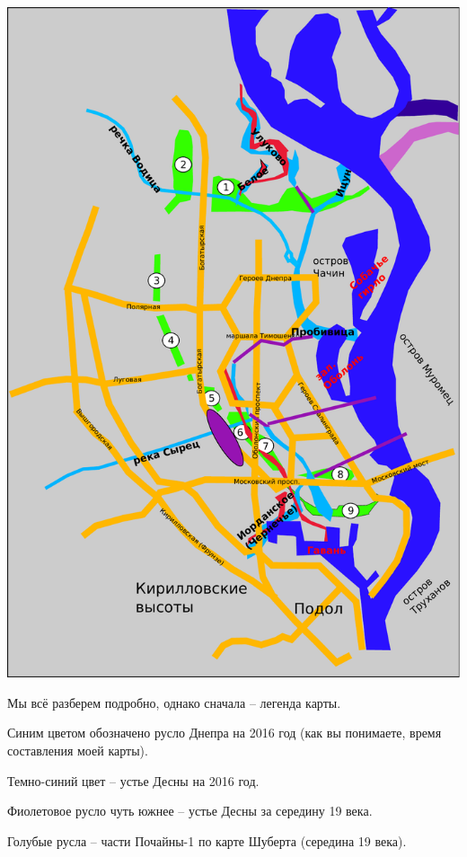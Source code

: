 \newpage
\vspace*{\fill}
\begin{center}
\includegraphics[width=\linewidth]{chast-colebanie-osnov/pochayna/posh2.pdf}
\end{center}
\vspace*{\fill}
\newpage

Мы всё разберем подробно, однако сначала – легенда карты.

Синим цветом обозначено русло Днепра на 2016 год (как вы понимаете, время составления моей карты).

Темно-синий цвет – устье Десны на 2016 год.

Фиолетовое русло чуть южнее – устье Десны за середину 19 века.

Голубые русла – части Почайны-1 по карте Шуберта (середина 19 века).

